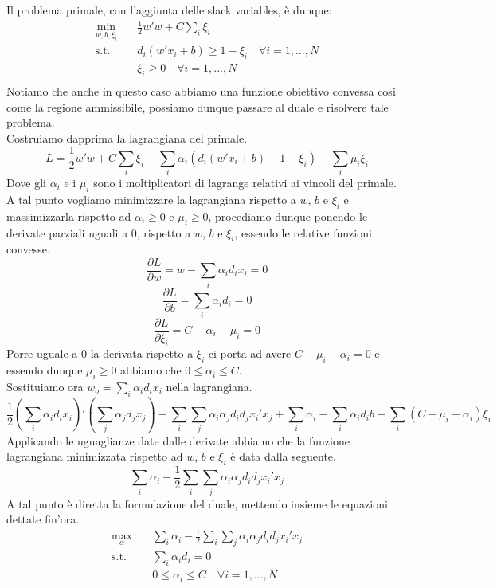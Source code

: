 \documentclass[12pt]{extarticle}
\begin{document}
Il problema primale, con l'aggiunta delle slack variables, è dunque:\\
\begin{equation}
\begin{aligned}
\min_{w, b, \xi_i} \quad & \frac{1}{2} w'w + C \sum_i \xi_i\\
\textrm{s.t.} \quad & d_i(w'x_i + b) \geq 1 - \xi_i \quad \forall i = 1, ..., N\\
  & \xi_i \geq 0 \quad \forall i = 1, ..., N\\
\end{aligned}
\end{equation}
Notiamo che anche in questo caso abbiamo una funzione obiettivo convessa cosi come la regione ammissibile, possiamo dunque passare al duale e risolvere tale problema.\\
Costruiamo dapprima la lagrangiana del primale.
\[ L = \frac{1}{2}w'w + C \sum_i \xi_i - \sum_i \alpha_i(d_i(w'x_i + b) - 1 + \xi_i) - \sum_i \mu_i \xi_i\]
Dove gli $\alpha_i$ e i $\mu_i$ sono i moltiplicatori di lagrange relativi ai vincoli del primale. A tal punto vogliamo minimizzare la lagrangiana rispetto a $w$, $b$ e $\xi_i$ e massimizzarla rispetto ad $\alpha_i \geq 0$ e $\mu_i \geq 0$, procediamo dunque ponendo le derivate parziali uguali a 0, rispetto a $w$, $b$ e $\xi_i$, essendo le relative funzioni convesse.
\[\frac{\partial L}{\partial w} = w - \sum_i \alpha_i d_i x_i = 0\]
\[\frac{\partial L}{\partial b} = \sum_i \alpha_i d_i = 0\]
\[\frac{\partial L}{\partial \xi_i} = C - \alpha_i - \mu_i = 0\]
Porre uguale a 0 la derivata rispetto a $\xi_i$ ci porta ad avere $C - \mu_i - \alpha_i = 0$ e essendo dunque $\mu_i \geq 0$ abbiamo che $0 \leq \alpha_i \leq C$.\\
Sostituiamo ora $w_o = \sum_i \alpha_i d_i x_i$ nella lagrangiana.\\
\[\frac{1}{2}(\sum_i \alpha_i d_i x_i)'(\sum_j \alpha_j d_j x_j) - \sum_i \sum_j \alpha_i \alpha_j d_i d_j x_i'x_j + \sum_i \alpha_i - \sum_i \alpha_i d_i b - \sum_i (C - \mu_i - \alpha_i) \xi_i\]
Applicando le uguaglianze date dalle derivate abbiamo che la funzione lagrangiana minimizzata rispetto ad $w$, $b$ e $\xi_i$ è data dalla seguente.
\[\sum_i \alpha_i - \frac{1}{2}\sum_i \sum_j \alpha_i \alpha_j d_i d_j x_i'x_j\]
A tal punto è diretta la formulazione del duale, mettendo insieme le equazioni dettate fin'ora.\\
\begin{equation}
\begin{aligned}
\max_{\alpha} \quad & \sum_i \alpha_i - \frac{1}{2}\sum_i \sum_j \alpha_i \alpha_j d_i d_j x_i'x_j\\
\textrm{s.t.} \quad & \sum_i \alpha_i d_i = 0\\
  & 0 \leq \alpha_i \leq C \quad \forall i = 1, ..., N\\
\end{aligned}
\end{equation}
\end{document}

